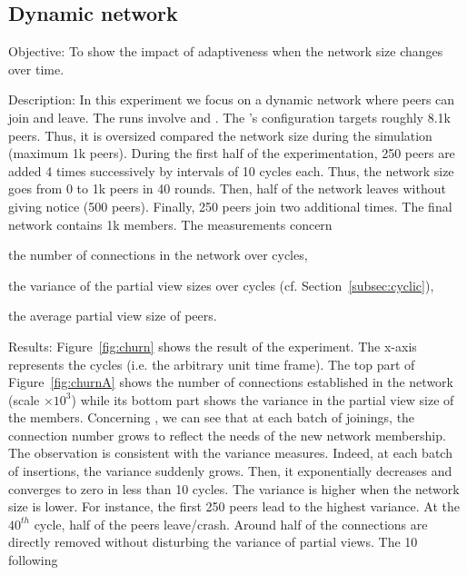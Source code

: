 \subsection{Dynamic network}

\begin{asparadesc}
\item[Objective:] To show the impact of adaptiveness when the network size
  changes over time.
\item[Description:] In this experiment we focus on a dynamic network where
  peers can join and leave. The runs involve \CYCLON and \SPRAY. The \CYCLON's
  configuration targets roughly 8.1k peers. Thus, it is oversized compared the
  network size during the simulation (maximum 1k peers). During the first half
  of the experimentation, 250 peers are added 4 times successively by intervals
  of 10 cycles each. Thus, the network size goes from 0 to 1k peers in 40
  rounds. Then, half of the network leaves without giving notice (500
  peers). Finally, 250 peers join two additional times. The final network
  contains 1k members. The measurements concern
  \begin{inparaenum}
  \item the number of connections in the network over cycles,
  \item the variance of the partial view sizes over cycles
    (cf. Section~\ref{subsec:cyclic}),
  \item the average partial view size of peers.
  \end{inparaenum}
\item[Results:] Figure~\ref{fig:churn} shows the result of the experiment. The
  x-axis represents the cycles (i.e. the arbitrary unit time frame). The top
  part of Figure~\ref{fig:churnA} shows the number of connections established
  in the network (scale $\times 10^3$) while its bottom part shows the variance
  in the partial view size of the members. Concerning \SPRAY, we can see that
  at each batch of joinings, the connection number grows to reflect the needs
  of the new network membership. The observation is consistent with the
  variance measures. Indeed, at each batch of insertions, the variance suddenly
  grows. Then, it exponentially decreases and converges to zero in less than 10
  cycles. The variance is higher when the network size is lower. For instance,
  the first 250 peers lead to the highest variance. At the $40^{th}$ cycle,
  half of the peers leave/crash. Around half of the connections are directly
  removed without disturbing the variance of partial views. The 10 following

\end{asparadesc}
